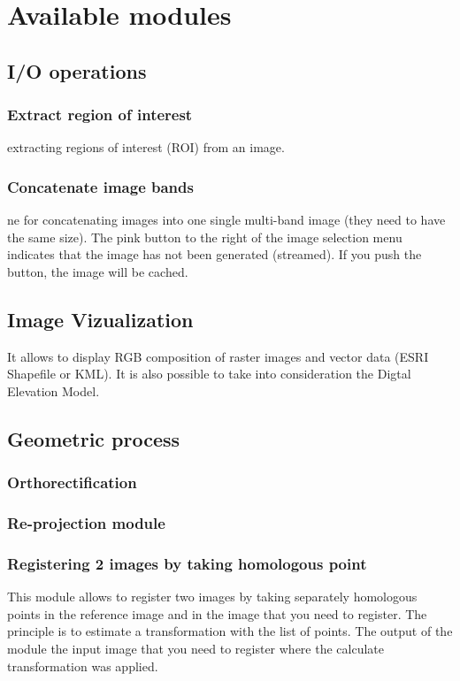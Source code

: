 \documentclass{InsightSoftwareGuide}
\begin{document}
\chapter{Available modules}
\section{I/O operations}
\subsection{Extract region of interest}
extracting regions of interest (ROI) from an image.
\subsection{Concatenate image bands}
ne for concatenating images into one single multi-band image (they need to have the same size).
The pink button to the right of the image selection menu indicates that the image has not been generated (streamed). 
If you push the button, the image will be cached. 
\section{Image Vizualization}
It allows to display RGB composition of raster images and vector data (ESRI Shapefile or KML). It is also possible to take into consideration
the Digtal Elevation Model. 
\section{Geometric process}
\subsection{Orthorectification}
\subsection{Re-projection module}
\subsection{Registering 2 images by taking homologous point}
This module allows to register two images by taking separately homologous points in the reference image and in the image 
that you need to register. The principle is to estimate a transformation with the list of points.
The output of the module the input image that you need to register where the calculate transformation was applied. 
\end{document}
